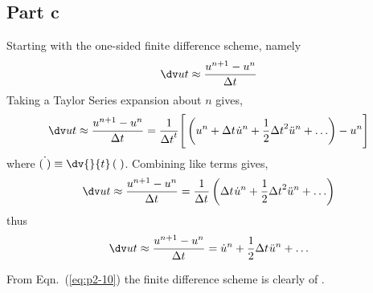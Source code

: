 \subsection{Part c}
Starting with the one-sided finite difference scheme, namely
\begin{equation}
    \findif
    \label{eq:p2-8}
\end{equation}
Taking a Taylor Series expansion about $n$ gives,
\begin{equation}
    \findif = \frac{1}{\Dt{t}} \Bigg[ \left( \un + \Dt{} \dot{u}^{n} + \frac{1}{2} \Dt{2} \ddot{u}^{n} + \HOTs \right) - \un \Bigg]
    \label{eq:p2-9}
\end{equation}
where $\dot{\left(\;\right)} \equiv \dv{}{t}\left(\;\right)$. Combining like terms gives,
\begin{equation}
    \findif = \frac{1}{\Dt{}} \left(  \Dt{} \dot{u}^{n} + \frac{1}{2} \Dt{2} \ddot{u}^{n} + \HOTs \right)
    \label{eq:p2-10}
\end{equation}
thus
\begin{equation}
    \findif = \dot{u}^{n} + \frac{1}{2} \Dt{} \ddot{u}^{n} + \HOTs
    \label{eq:p2-11}
\end{equation}

From Eqn.~(\ref{eq:p2-10}) the finite difference scheme is clearly of .

    




                    

                                                                            

